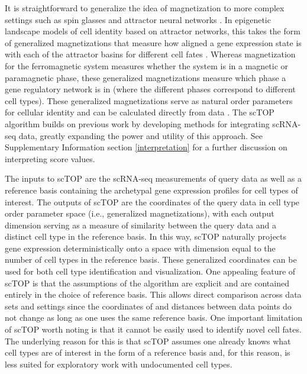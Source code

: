 \documentclass[vruler,JEB]{COB}%
\begin{document}
It is straightforward to generalize the idea of magnetization to more complex settings such as spin glasses and attractor neural networks \citep{amit1985spin}. In epigenetic landscape models of cell identity based on attractor networks, this takes the form of generalized magnetizations that measure how aligned a gene expression state is with each of the attractor basins for different cell fates \citep{lang_epigenetic_2014,pusuluri_cellular_2017}. Whereas magnetization for the ferromagnetic system measures whether the system is in a magnetic or paramagnetic phase, these generalized magnetizations measure which phase a gene regulatory network is in (where the different phases correspond to different cell types). These generalized magnetizations serve as natural order parameters for cellular identity and can be calculated directly from data \citep{lang_epigenetic_2014,pusuluri_cellular_2017, dame_thyroid_2017,ikonomou_vivo_2020}. The scTOP algorithm builds on previous work by developing methods for integrating scRNA-seq data, greatly expanding the power and utility of this approach. See Supplementary Information section \ref{interpretation} for a further discussion on interpreting score values.
 
The inputs to scTOP are the scRNA-seq measurements of query data as well as a reference basis containing the archetypal gene expression profiles for cell types of interest. The outputs of scTOP are the coordinates of the query data in cell type order parameter space (i.e., generalized magnetizations), with each output dimension serving as a measure of similarity between the query data and a distinct cell type in the reference basis. In this way, scTOP naturally projects gene expression deterministically onto a space with dimension equal to the number of cell types in the reference basis. These generalized coordinates can be used for both cell type identification and visualization. One appealing feature of scTOP is that the assumptions of the algorithm are explicit and are contained entirely in the choice of reference basis. This allows direct comparison across data sets and settings since the coordinates of and distances between data points do not change as long as one uses the same reference basis. One important limitation of scTOP worth noting is that it cannot be easily used to identify novel cell fates. The underlying reason for this is that scTOP assumes one already knows what cell types are of interest in the form of a reference basis and, for this reason, is less suited for exploratory work with undocumented cell types. 
\end{document}
